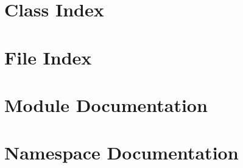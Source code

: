 \let\mypdfximage\pdfximage\def\pdfximage{\immediate\mypdfximage}\documentclass[twoside]{book}
\newcommand{\+}{\discretionary{\mbox{\scriptsize$\hookleftarrow$}}{}{}}
\begin{document}
\chapter{Class Index}

\chapter{File Index}

\chapter{Module Documentation}





\chapter{Namespace Documentation}

\end{document}
